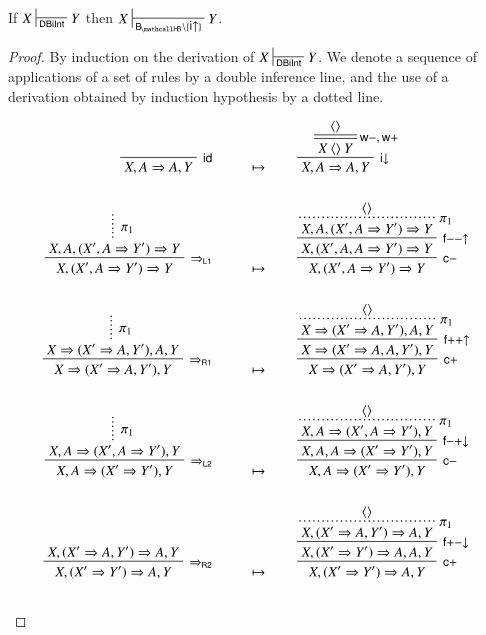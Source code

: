 \begin{lemma}
  
  If $X \prov{\msys{DBiInt}} Y$ then $X \prov{\sysBHB \setminus
  \{\rsf{i{\uparrow}}\}} Y$.
\end{lemma}
\begin{proof}
  By induction on the derivation of $X \prov{\msys{DBiInt}} Y$. We denote a
  sequence of applications of a set of rules by a double inference line, and the
  use of a derivation obtained by induction hypothesis by a dotted line.

  \newcommand{\mt}{\qquad\mapsto\qquad}
  \begin{align*}
    \R[\rsf{id}]
      {}
      {X, A \seq A, Y}
    &\mt
    \R[\rsf{i{\downarrow}}]
    {\prftree[r][d]{\rsf{w{-},w{+}}}
    {\piq{}}
    {X \piq{} Y}}
    {X, A \seq A, Y}
    \\\\
    \R[\rsf{\seq_{L1}}]
      {\summ[$\pi_1$]{X, A, (X', A \seq Y') \seq Y}}
      {X, (X', A \seq Y') \seq Y}
    &\mt
    \R[\rsf{c{-}}]
    {\R[\rsf{f{-}{-}{\uparrow}}]
    {\prftree[r][dotted]{$\pi_1$}
    {\piq{}}
    {X, A, (X', A \seq Y') \seq Y}}
    {X, (X', A, A \seq Y') \seq Y}}
    {X, (X', A \seq Y') \seq Y}
    \\\\
    \R[\rsf{\seq_{R1}}]
      {\summ[$\pi_1$]{X \seq  (X' \seq A, Y'), A, Y}}
      {X \seq (X' \seq A, Y'), Y}
    &\mt
    \R[\rsf{c{+}}]
    {\R[\rsf{f{+}{+}{\uparrow}}]
    {\prftree[r][dotted]{$\pi_1$}
    {\piq{}}
    {X \seq (X' \seq A, Y'), A, Y}}
    {X \seq (X' \seq A, A, Y'), Y}}
    {X \seq (X' \seq A, Y'), Y}
    \\\\
    \R[\rsf{\seq_{L2}}]
      {\summ[$\pi_1$]{X, A \seq (X', A \seq Y'), Y}}
      {X, A \seq (X' \seq Y'), Y}
    &\mt
    \R[\rsf{c{-}}]
    {\R[\rsf{f{-}{+}{\downarrow}}]
    {\prftree[r][dotted]{$\pi_1$}
    {\piq{}}
    {X, A \seq (X', A \seq Y'), Y}}
    {X, A, A \seq (X' \seq Y'), Y}}
    {X, A \seq (X' \seq Y'), Y}
    \\\\
    \R[\rsf{\seq_{R2}}]
      {X, (X' \seq A, Y') \seq A, Y}
      {X, (X' \seq Y') \seq A, Y}
    &\mt
    \R[\rsf{c{+}}]
    {\R[\rsf{f{+}{-}{\downarrow}}]
    {\prftree[r][dotted]{$\pi_1$}
    {\piq{}}
    {X, (X' \seq A, Y') \seq A, Y}}
    {X, (X' \seq Y') \seq A, A, Y}}
    {X, (X' \seq Y') \seq A, Y}
    \\\\

\end{align*}
\end{proof}
